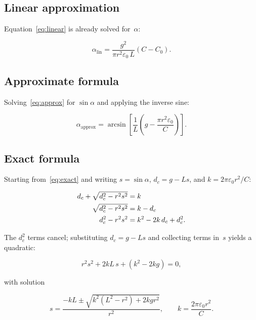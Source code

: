 \documentclass[11pt,a4paper]{article}
\begin{document}
\subsection{Linear approximation}

Equation~\eqref{eq:linear} is already solved for~$\alpha$:

\begin{equation}
  \alpha_{\text{lin}} = \frac{g^2}{\pi r^2 \varepsilon_0\, L}
                        \!\left(C - C_0\right).
  \label{eq:alphaLin}
\end{equation}

\subsection{Approximate formula}

Solving~\eqref{eq:approx} for $\sin\alpha$ and applying the inverse sine:

\begin{equation}
  \boxed{\alpha_{\text{approx}} = \arcsin\!\left[\frac{1}{L}
         \!\left(g - \frac{\pi r^2 \varepsilon_0}{C}\right)\right].}
  \label{eq:alphaApprox}
\end{equation}

\subsection{Exact formula}

Starting from~\eqref{eq:exact} and writing $s = \sin\alpha$,
$d_c = g - Ls$, and $k = 2\pi\varepsilon_0 r^2 / C$:

\begin{align}
  d_c + \sqrt{d_c^2 - r^2 s^2} &= k \notag \\
  \sqrt{d_c^2 - r^2 s^2}        &= k - d_c \notag \\
  d_c^2 - r^2 s^2               &= k^2 - 2k\,d_c + d_c^2.
\end{align}

The $d_c^2$ terms cancel; substituting $d_c = g - Ls$ and collecting
terms in~$s$ yields a quadratic:

\begin{equation}
  r^2 s^2 + 2kL\,s + (k^2 - 2kg) = 0,
\end{equation}

with solution

\begin{equation}
  s = \frac{-kL \pm \sqrt{k^2(L^2 - r^2) + 2kgr^2}}{r^2},
  \qquad k = \frac{2\pi\varepsilon_0 r^2}{C}.
  \label{eq:quadSol}
\end{equation}
\end{document}
